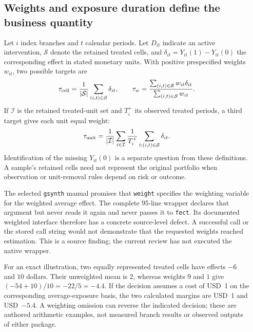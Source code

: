 \subsection{Weights and exposure duration define the business quantity}
\label{exec21:gsynth-target}

Let $i$ index branches and $t$ calendar periods. Let $D_{it}$ indicate an
active intervention, $\mathcal S$ denote the retained treated cells, and
$\delta_{it}=Y_{it}(1)-Y_{it}(0)$ the corresponding effect in stated monetary
units. With positive prespecified weights $w_{it}$, two possible targets are
\begin{equation}
\label{exec21:gsynth-weights}
 \tau_{\rm cell}=\frac{1}{|\mathcal S|}\sum_{(i,t)\in\mathcal S}\delta_{it},
 \qquad
 \tau_w=\frac{\sum_{(i,t)\in\mathcal S}w_{it}\delta_{it}}
                  {\sum_{(i,t)\in\mathcal S}w_{it}}.
\end{equation}
If $\mathcal I$ is the retained treated-unit set and $T_i^+$ its observed
treated periods, a third target gives each unit equal weight:
\begin{equation}
\label{exec21:gsynth-units}
 \tau_{\rm unit}=\frac{1}{|\mathcal I|}\sum_{i\in\mathcal I}
       \frac{1}{T_i^+}\sum_{t:(i,t)\in\mathcal S}\delta_{it}.
\end{equation}
Identification of the missing $Y_{it}(0)$ is a separate question from these
definitions. A sample's retained cells need not represent the original
portfolio when observation or unit-removal rules depend on risk or outcome.

The selected \texttt{gsynth} manual promises that \texttt{weight} specifies
the weighting variable for the weighted average effect. The complete
95-line wrapper declares that argument but never reads it again and never
passes it to \texttt{fect}. Its documented weighted interface therefore has
a concrete source-level defect. A successful call or the stored call string
would not demonstrate that the requested weights reached estimation.
This is a source finding; the current review has not executed the native
wrapper. \cite{exec21_gsynth_wrapper}

For an exact illustration, two equally represented treated cells have effects
$-6$ and $10$ dollars. Their unweighted mean is $2$, whereas weights $9$ and
$1$ give $(-54+10)/10=-22/5=-4.4$. If the decision assumes a cost of USD~1
on the corresponding average-exposure basis, the two calculated margins are
USD~1 and USD~$-5.4$. A weighting omission can reverse the indicated decision;
these are authored arithmetic examples, not measured branch results or
observed outputs of either package. \cite{exec21_gsynth_reference}

